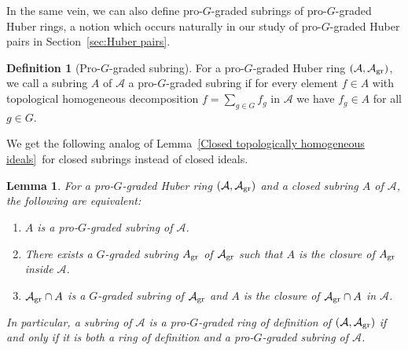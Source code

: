 \documentclass[12pt,twoside,a4paper]{article}
\newtheorem{lemma}[thm]{Lemma}
\theoremstyle{definition}
\newtheorem{mydef}[thm]{Definition}
\theoremstyle{remark}
\newcommand\gr{{\rm gr}}
\begin{document}
In the same vein, we can also define pro-$G$-graded subrings of pro-$G$-graded Huber rings, a notion which occurs naturally in our study of pro-$G$-graded Huber pairs in Section~\ref{sec:Huber pairs}.
\begin{mydef}[Pro-$G$-graded subring]\label{Pro-graded subring, definition}For a pro-$G$-graded Huber ring $(\mathcal{A}, \mathcal{A}_{\gr})$, we call a subring $A$ of $\mathcal{A}$ a pro-$G$-graded subring if for every element $f\in A$ with topological homogeneous decomposition $f=\sum_{g\in G}f_{g}$ in $\mathcal{A}$ we have $f_{g}\in A$ for all $g\in G$.\end{mydef}
We get the following analog of Lemma~\ref{Closed topologically homogeneous ideals} for closed subrings instead of closed ideals.
\begin{lemma}\label{Closed pro-graded subrings}For a pro-$G$-graded Huber ring $(\mathcal{A}, \mathcal{A}_{\gr})$ and a closed subring $A$ of $\mathcal{A}$, the following are equivalent:\begin{enumerate}[(1)]\item $A$ is a pro-$G$-graded subring of $\mathcal{A}$. \item There exists a $G$-graded subring $A_{\gr}$ of $\mathcal{A}_{\gr}$ such that $A$ is the closure of $A_{\gr}$ inside $\mathcal{A}$. \item $\mathcal{A}_{\gr}\cap A$ is a $G$-graded subring of $\mathcal{A}_{\gr}$ and $A$ is the closure of $\mathcal{A}_{\gr}\cap A$ in $\mathcal{A}$.\end{enumerate}In particular, a subring of $\mathcal{A}$ is a pro-$G$-graded ring of definition of $(\mathcal{A}, \mathcal{A}_{\gr})$ if and only if it is both a ring of definition and a pro-$G$-graded subring of $\mathcal{A}$.\end{lemma}
\end{document}
